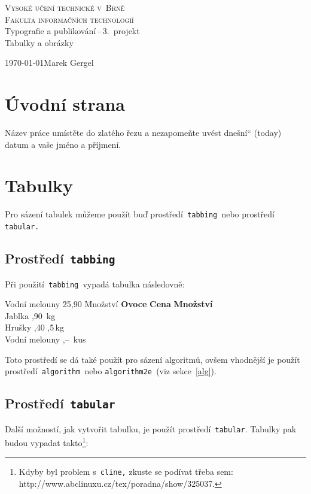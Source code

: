 \documentclass[a4paper, 11pt]{article}
\providecommand{\uv}[1]{\quotedblbase#1\textquotedblleft}
\begin{document}
\thispagestyle{empty}
\begin{titlepage}
    \begin{center}
        \textsc{\Huge Vysoké učení technické v~Brně\\ \medskip
        \huge Fakulta informačních technologií}\\ \bigskip
        {\LARGE Typografie a publikování\,--\,3.\ projekt\medskip \\} 
        {\Huge Tabulky a obrázky}
    \end{center}
    {\Large \today \hfill Marek Gergel \\}
\end{titlepage}

\section{Úvodní strana}
Název práce umístěte do zlatého řezu a nezapomeňte uvést \uv{dnešní} (today) datum a vaše jméno a příjmení.

\section{Tabulky}
Pro sázení tabulek můžeme použít buď prostředí\verb| tabbing |nebo prostředí\verb| tabular.|

\subsection{Prostředí\texttt{ tabbing}}
Při použití\verb| tabbing |vypadá tabulka následovně:
\begin{tabbing}
    Vodní melouny \quad \= 25,90 \quad \= Množství \kill
    \textbf{Ovoce} \> \textbf{Cena} \> \textbf{Množství} \\
    Jablka ,90 \,kg \\
    Hrušky ,40 ,5\,kg \\
    Vodní melouny ,-- \,kus \\
\end{tabbing}
\noindent Toto prostředí se dá také použít pro sázení algoritmů, ovšem vhodnější je použít prostředí\verb| algorithm |nebo \verb|algorithm2e |(viz sekce~\ref{alg}).

\subsection{Prostředí\texttt{ tabular}}
Další možností, jak vytvořit tabulku, je použít prostředí\verb| tabular|. Tabulky pak budou vypadat takto\footnote{Kdyby byl problem s\texttt{ cline,} zkuste se podívat třeba sem: http://www.abclinuxu.cz/tex/poradna/show/325037.}:
\bigskip
\end{document}
